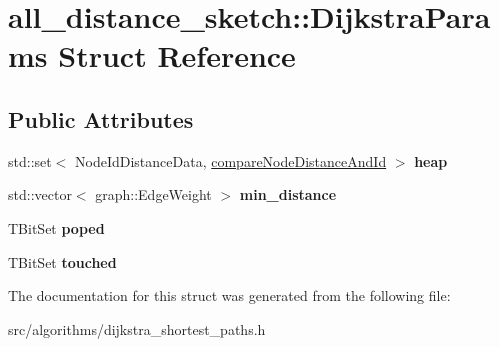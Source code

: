\hypertarget{structall__distance__sketch_1_1DijkstraParams}{}\section{all\+\_\+distance\+\_\+sketch\+:\+:Dijkstra\+Params Struct Reference}
\label{structall__distance__sketch_1_1DijkstraParams}
\subsection*{Public Attributes}
\begin{DoxyCompactItemize}
\item 
\hypertarget{structall__distance__sketch_1_1DijkstraParams_a5cccaa0ed42acd56d70832d45665de3f}{}std\+::set$<$ Node\+Id\+Distance\+Data, \hyperlink{structall__distance__sketch_1_1compareNodeDistanceAndId}{compare\+Node\+Distance\+And\+Id} $>$ {\bfseries heap}\label{structall__distance__sketch_1_1DijkstraParams_a5cccaa0ed42acd56d70832d45665de3f}

\item 
\hypertarget{structall__distance__sketch_1_1DijkstraParams_adda808a08054b02248a274476b446b98}{}std\+::vector$<$ graph\+::\+Edge\+Weight $>$ {\bfseries min\+\_\+distance}\label{structall__distance__sketch_1_1DijkstraParams_adda808a08054b02248a274476b446b98}

\item 
\hypertarget{structall__distance__sketch_1_1DijkstraParams_abc63a828c5f6e0f9d010771e427d9e98}{}T\+Bit\+Set {\bfseries poped}\label{structall__distance__sketch_1_1DijkstraParams_abc63a828c5f6e0f9d010771e427d9e98}

\item 
\hypertarget{structall__distance__sketch_1_1DijkstraParams_a01b303ece98e26c22785a99fd1e2094c}{}T\+Bit\+Set {\bfseries touched}\label{structall__distance__sketch_1_1DijkstraParams_a01b303ece98e26c22785a99fd1e2094c}

\end{DoxyCompactItemize}


The documentation for this struct was generated from the following file\+:\begin{DoxyCompactItemize}
\item 
src/algorithms/dijkstra\+\_\+shortest\+\_\+paths.\+h\end{DoxyCompactItemize}

